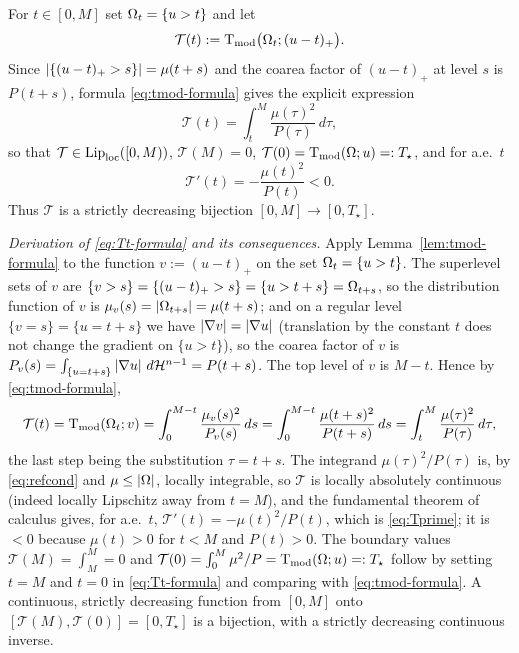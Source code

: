 For $t\in[0,M]$ set $\Omega_t=\{u>t\}$ and let
\begin{equation}\label{eq:Tt}
  \mathcal T(t):=\operatorname{T_{\mathrm{mod}}}\bigl(\Omega_t;(u-t)_+\bigr).
\end{equation}
Since $\left|\{(u-t)_+>s\}\right|=\mu(t+s)$ and the coarea factor of $(u-t)_+$ at
level $s$ is $P(t+s)$, formula \eqref{eq:tmod-formula} gives the explicit
expression
\begin{equation}\label{eq:Tt-formula}
  \mathcal T(t)=\int_t^M\frac{\mu(\tau)^2}{P(\tau)}\,d\tau,
\end{equation}
so that $\mathcal T\in\mathrm{Lip}_{\rm loc}([0,M))$, $\mathcal T(M)=0$,
$\mathcal T(0)=\operatorname{T_{\mathrm{mod}}}(\Omega;u)=:T_\star$, and for a.e.\ $t$
\begin{equation}\label{eq:Tprime}
  \mathcal T'(t)=-\frac{\mu(t)^2}{P(t)}<0 .
\end{equation}
Thus $\mathcal T$ is a strictly decreasing bijection $[0,M]\to[0,T_\star]$.

\emph{Derivation of \eqref{eq:Tt-formula} and its consequences.} Apply
Lemma~\ref{lem:tmod-formula} to the function $v:=(u-t)_+$ on the set
$\Omega_t=\{u>t\}$. The superlevel sets of $v$ are
$\{v>s\}=\{(u-t)_+>s\}=\{u>t+s\}=\Omega_{t+s}$, so the distribution function of
$v$ is $\mu_v(s)=\left|\Omega_{t+s}\right|=\mu(t+s)$; and on a regular level
$\{v=s\}=\{u=t+s\}$ we have $\left|\nabla v\right|=\left|\nabla u\right|$ (translation by
the constant $t$ does not change the gradient on $\{u>t\}$), so the coarea
factor of $v$ is $P_v(s)=\int_{\{u=t+s\}}\left|\nabla u\right|\,d\mathcal H^{n-1}=P(t+s)$. The top
level of $v$ is $M-t$. Hence by \eqref{eq:tmod-formula},
\[
  \mathcal T(t)=\operatorname{T_{\mathrm{mod}}}(\Omega_t;v)
  =\int_0^{M-t}\frac{\mu_v(s)^2}{P_v(s)}\,ds
  =\int_0^{M-t}\frac{\mu(t+s)^2}{P(t+s)}\,ds
  =\int_t^M\frac{\mu(\tau)^2}{P(\tau)}\,d\tau,
\]
the last step being the substitution $\tau=t+s$. The integrand
$\mu(\tau)^2/P(\tau)$ is, by \eqref{eq:refcond} and $\mu\le\left|\Omega\right|$, locally
integrable, so $\mathcal T$ is locally absolutely continuous (indeed locally
Lipschitz away from $t=M$), and the fundamental theorem of calculus gives,
for a.e.\ $t$, $\mathcal T'(t)=-\mu(t)^2/P(t)$, which is \eqref{eq:Tprime};
it is $<0$ because $\mu(t)>0$ for $t<M$ and $P(t)>0$. The boundary values
$\mathcal T(M)=\int_M^M=0$ and $\mathcal T(0)=\int_0^M\mu^2/P
=\operatorname{T_{\mathrm{mod}}}(\Omega;u)=:T_\star$ follow by setting $t=M$ and $t=0$ in
\eqref{eq:Tt-formula} and comparing with \eqref{eq:tmod-formula}. A
continuous, strictly decreasing function from $[0,M]$ onto
$[\mathcal T(M),\mathcal T(0)]=[0,T_\star]$ is a bijection, with a strictly
decreasing continuous inverse.


